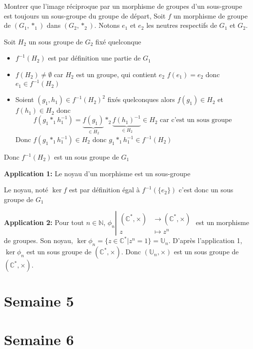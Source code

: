 \documentclass{article}
\renewenvironment{question_kholle}[2][ ]
{
	\subsection{\texorpdfstring{#2}{}}
	\notblank{#1}
	{
		\noindent #1
		\bigbreak
	}
	{}
	\begin{proof}
}
{
	\end{proof}
}
\begin{document}
\begin{question_kholle}{Montrer que l'image réciproque par un morphisme de groupes d'un sous-groupe est toujours un sous-groupe du groupe de départ, }
    Soit $f$ un morphisme de groupe de $(G_{1},*_{1})$ dans $(G_{2}, *_{2})$. Notons $e_{1}$ et $e_{2}$ les neutres respectifs de $G_{1}$ et $G_{2}$.
    
    Soit $H_{2}$ un sous groupe de $G_{2}$ fixé quelconque
    \begin{itemize}[label=$\star$]
        \item $f^{-1}(H_{2})$ est par définition une partie de $G_{1}$
        \item $f(H_{2}) \neq \emptyset$ car $H_{2}$ est un groupe, qui contient $e_{2}$ $f(e_{1}) = e_{2}$ donc $e_{1} \in f^{-1}(H_{2})$
        \item Soient $(g_{1},h_{1}) \in f^{-1}(H_{2})^{2}$ fixés quelconques
        alors $f(g_{1}) \in H_{2}$ et $f(h_{1}) \in H_{2}$
        donc
        $$
        f(g_{1} *_{1} h_{1}^{-1}) = \underbrace{ f(g_{1}) }_{ \in H_{2} }*_{2}\underbrace{ f(h_{1})^{-1} }_{ \in H_{2} } \in H_{2} \text{ car c'est un sous groupe}$$
        Donc $f(g_{1} *_{1} h_{1}^{-1}) \in H_{2}$ donc $g_{1} *_{1} h_{1}^{-1} \in f^{-1}(H_{2})$
    \end{itemize}
    Donc $f^{-1}(H_{2})$ est un sous groupe de $G_{1}$
\end{question_kholle}
    
\textbf{Application 1:} Le noyau d'un morphisme est un sous-groupe

Le noyau, noté $\ker f$ est par définition égal à $f^{-1}(\{e_2\})$ c'est donc un sous groupe de $G_1$

\textbf{Application 2:} Pour tout $n \in \mathbb{N}$, $\phi _{n}\left|\begin{array}{ll} (\mathbb{C}^{*},\times) &\to (\mathbb{C}^{*},\times) \\ z &\mapsto z^{n} \end{array}\right.$ est un morphisme de groupes. Son noyau, $\ker \phi _n = \{ z \in \mathbb{C}^{*} | z^{n} = 1 \} = \mathbb{U}_{n}$. D'après l'application 1, $\ker \phi_{n}$ est un sous groupe de $(\mathbb{C}^{*}, \times)$. Donc $(\mathbb{U}_{n}, \times)$ est un sous groupe de $(\mathbb{C}^{*},\times)$.
\pagebreak\section{Semaine 5}

\pagebreak\section{Semaine 6}
\end{document}

